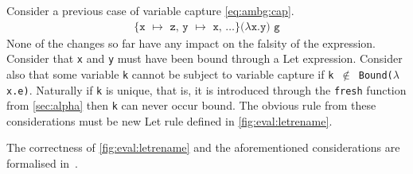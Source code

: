 Consider a previous case of variable capture \autoref{eq:ambg:cap}.
\begin{align}
	\texttt{\{x $\mapsto$ z, y $\mapsto$ x, $\dots$\}($\lambda$x.y) g}\label{eq:ambg:cap}
\end{align}
None of the changes so far have any impact on the falsity of the expression.
Consider that \texttt{x} and \texttt{y} must have been bound through a Let expression.
Consider also that some variable \texttt{k} cannot be subject to variable capture if \texttt{k $\notin$ Bound($\lambda$x.e)}.
Naturally if \texttt{k} is unique, that is, it is introduced through the \texttt{fresh} function from \autoref{sec:alpha} then \texttt{k} can never occur bound.
The obvious rule from these considerations must be new Let rule defined in \autoref{fig:eval:letrename}.
\begin{figure}[ht]
	\begin{mdframed}
		\begin{prooftree}
		\end{prooftree}
	\end{mdframed}
	\caption{}
	\label{fig:eval:letrename}
\end{figure}
The correctness of \autoref{fig:eval:letrename} and the aforementioned considerations are formalised in~\cite{sestoft1997deriving}.


